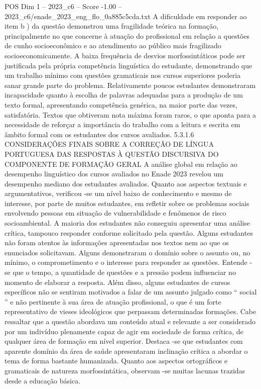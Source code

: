 \begin{textsample}{POS Dim 1 – 2023\_c6 – Score -1.00 – 2023\_c6/enade\_2023\_eng\_flo\_0a885c5cda.txt}
A dificuldade em responder ao item b ) da questão demonstrou uma fragilidade teórica na formação, principalmente no que concerne à atuação do profissional em relação a questões de cunho socioeconômico e ao atendimento ao público mais fragilizado socioeconomicamente.
A baixa frequência de desvios morfossintáticos pode ser justificada pela própria competência linguística do estudante, demonstrando que um trabalho mínimo com questões gramaticais nos cursos superiores poderia sanar grande parte do problema.
Relativamente poucos estudantes demonstraram incapacidade quanto à escolha de palavras adequadas para a produção de um texto formal, apresentando competência genérica, na maior parte das vezes, satisfatória.
Textos que obtiveram nota máxima foram raros, o que aponta para a necessidade de reforçar a importância do trabalho com a leitura e escrita em âmbito formal com os estudantes dos cursos avaliados. 5.3.1.6 CONSIDERAÇÕES FINAIS SOBRE A CORREÇÃO DE LÍNGUA PORTUGUESA DAS RESPOSTAS À QUESTÃO DISCURSIVA DO COMPONENTE DE FORMAÇÃO GERAL A análise global em relação ao desempenho linguístico dos cursos avaliados no Enade 2023 revelou um desempenho mediano dos estudantes avaliados.
Quanto aos aspectos textuais e argumentativos, verificou -se um nível baixo de conhecimento e mesmo de interesse, por parte de muitos estudantes, em refletir sobre os problemas sociais envolvendo pessoas em situação de vulnerabilidade e fenômenos de risco socioambiental.
A maioria dos estudantes não conseguiu apresentar uma análise crítica, tampouco responder conforme solicitado pela questão.
Alguns estudantes não foram atentos às informações apresentadas nos textos nem ao que os enunciados solicitavam.
Alguns demonstraram o domínio sobre o assunto ou, no mínimo, o comprometimento e o interesse para responder as questões.
Entende -se que o tempo, a quantidade de questões e a pressão podem influenciar no momento de elaborar a resposta.
Além disso, alguns estudantes de cursos específicos não se sentiram motivados a falar de um assunto julgado como “ social ” e não pertinente à sua área de atuação profissional, o que é um forte representativo de vieses ideológicos que perpassam determinadas formações.
Cabe ressaltar que a questão abordava um conteúdo atual e relevante a ser considerado por um indivíduo plenamente capaz de agir em sociedade de forma crítica, de qualquer área de formação em nível superior.
Destaca -se que estudantes com aparente domínio da área de saúde apresentaram inclinação crítica a abordar o tema de forma bastante humanizada.
Quanto aos aspectos ortográficos e gramaticais de natureza morfossintática, observam -se muitas lacunas trazidas desde a educação básica.

\end{textsample}
